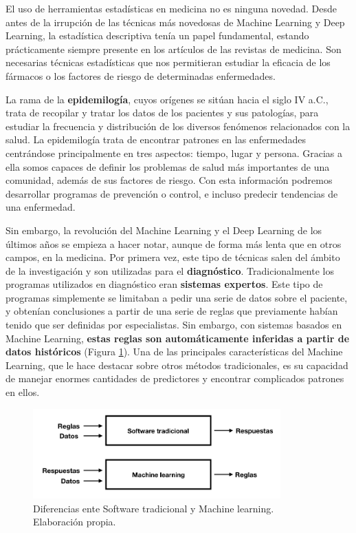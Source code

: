 \documentclass[
  12pt,
  spanish,
  a4paperpaper,
]{report}
\begin{document}
El uso de herramientas estadísticas en medicina no es ninguna novedad.
Desde antes de la irrupción de las técnicas más novedosas de Machine
Learning y Deep Learning, la estadística descriptiva tenía un papel
fundamental, estando prácticamente siempre presente en los artículos de
las revistas de medicina. Son necesarias técnicas estadísticas que nos
permitieran estudiar la eficacia de los fármacos o los factores de
riesgo de determinadas enfermedades.

La rama de la \textbf{epidemilogía}, cuyos orígenes se sitúan hacia el
siglo IV a.C., trata de recopilar y tratar los datos de los pacientes y
sus patologías, para estudiar la frecuencia y distribución de los
diversos fenómenos relacionados con la salud. La epidemilogía trata de
encontrar patrones en las enfermedades centrándose principalmente en
tres aspectos: tiempo, lugar y persona. Gracias a ella somos capaces de
definir los problemas de salud más importantes de una comunidad, además
de sus factores de riesgo. Con esta información podremos desarrollar
programas de prevención o control, e incluso predecir tendencias de una
enfermedad.

Sin embargo, la revolución del Machine Learning y el Deep Learning de
los últimos años se empieza a hacer notar, aunque de forma más lenta que
en otros campos, en la medicina. Por primera vez, este tipo de técnicas
salen del ámbito de la investigación y son utilizadas para el
\textbf{diagnóstico}. Tradicionalmente los programas utilizados en
diagnóstico eran \textbf{sistemas expertos}. Este tipo de programas
simplemente se limitaban a pedir una serie de datos sobre el paciente, y
obtenían conclusiones a partir de una serie de reglas que previamente
habían tenido que ser definidas por especialistas. Sin embargo, con
sistemas basados en Machine Learning, \textbf{estas reglas son
automáticamente inferidas a partir de datos históricos} (Figura
\ref{tradicional}). Una de las principales características del Machine
Learning, que le hace destacar sobre otros métodos tradicionales, es su
capacidad de manejar enormes cantidades de predictores y encontrar
complicados patrones en ellos.

\begin{figure}
\centering
\includegraphics[width=0.85\textwidth,height=\textheight]{source/figures/tradicional.png}
\caption{Diferencias ente Software tradicional y Machine learning.
Elaboración propia. \label{tradicional}}
\end{figure}
\end{document}
